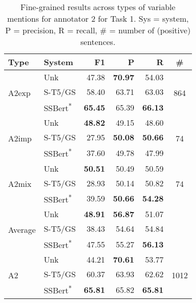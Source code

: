 \documentclass[11pt]{article}
\begin{document}
\begin{table*}[]
    \centering
    \begin{tabular}{l|l|r|r|r|c}
    Type &     System &     F1 &      P &      R &  \# \\
    \hline
    \hline
    \multirow{3}{3em}{A2exp} & Unk &  47.38 &  \textbf{70.97} &  54.03 &  \multirow{3}{2em}{864} \\
      &  S-T5/GS  &  58.40 &  63.71 &  63.03 &   \\
       &  SSBert\textsuperscript{*}  &  \textbf{65.45} &  65.39 &  \textbf{66.13} &   \\
    \hline
    \multirow{3}{3em}{A2imp} & Unk &  \textbf{48.82} &  49.15 &  48.60 &  \multirow{3}{2em}{74} \\ 
      &  S-T5/GS  &  27.95 &  \textbf{50.08} &  \textbf{50.66} &   \\
       &  SSBert\textsuperscript{*}  &  37.60 &  49.78 &  47.99 &   \\
    \hline
    \multirow{3}{3em}{A2mix} & Unk &  \textbf{50.51} &  50.49 &  50.59 &  \multirow{3}{2em}{74} \\
      &  S-T5/GS  &  28.93 &  50.14 &  50.82 &   \\
       &  SSBert\textsuperscript{*}  &  39.59 &  \textbf{50.66} &  \textbf{54.28} &   \\
    \hline
    \multirow{3}{3em}{Average} & Unk &  \textbf{48.91} &  \textbf{56.87} &  51.07 &   \\
      &  S-T5/GS  &  38.43 &  54.64 &  54.84 &   \\
       &  SSBert\textsuperscript{*}  &  47.55 &  55.27 &  \textbf{56.13} &   \\
    \hline
    \multirow{3}{3em}{A2}  & Unk &  44.21 &  \textbf{70.61} &  53.77 &  \multirow{3}{2em}{1012} \\
       &   S-T5/GS   &  60.37 &  63.93 &  62.62 &   \\
        &   SSBert\textsuperscript{*}   &  \textbf{65.81} &  65.82 &  \textbf{65.81} &   \\
    \hline
    \end{tabular}
    \caption{Fine-grained results across types of variable mentions for annotator 2 for Task 1. Sys = system, P = precision, R = recall, \# = number of (positive) sentences.}
    \label{tab:T1-Ann2}
\end{table*}
\end{document}
